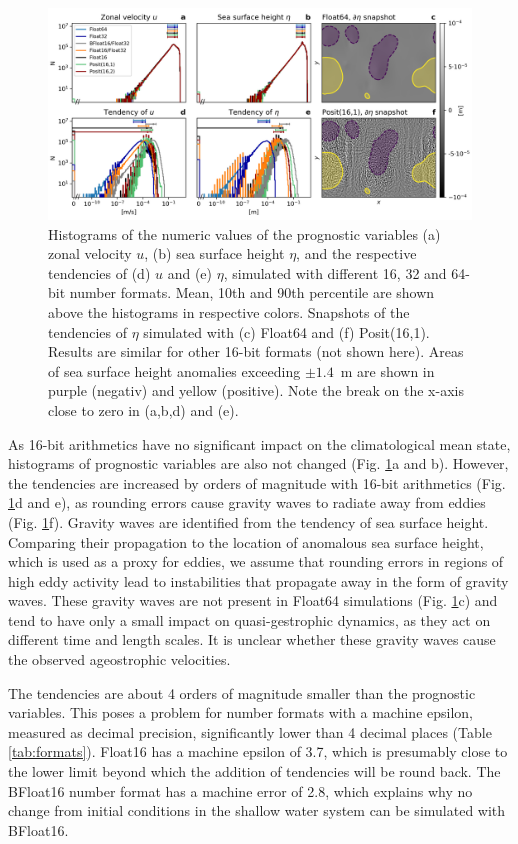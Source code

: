 \documentclass[draft]{agujournal2019}
\begin{document}
\begin{figure}
\includegraphics[width=1\textwidth]{../plots/tendency_hist.png}
\caption{Histograms of the numeric values of the prognostic variables (a) zonal velocity $u$, (b) sea surface height $\eta$, and the respective tendencies of (d) $u$ and (e) $\eta$, simulated with different 16, 32 and 64-bit number formats. Mean, 10th and 90th percentile are shown above the histograms in respective colors. Snapshots of the tendencies of $\eta$ simulated with (c) Float64 and (f) Posit(16,1). Results are similar for other 16-bit formats (not shown here). Areas of sea surface height anomalies exceeding $\pm1.4$~m are shown in purple (negativ) and yellow (positive). Note the break on the x-axis close to zero in (a,b,d) and (e).}
\label{fig:tend}
\end{figure}

As 16-bit arithmetics have no significant impact on the climatological mean state, histograms of prognostic variables are also not changed (Fig. \ref{fig:tend}a and b). However, the tendencies are increased by orders of magnitude with 16-bit arithmetics (Fig. \ref{fig:tend}d and e), as rounding errors cause gravity waves to radiate away from eddies (Fig. \ref{fig:tend}f). Gravity waves are identified from the tendency of sea surface height. Comparing their propagation to the location of anomalous sea surface height, which is used as a proxy for eddies, we assume that rounding errors in regions of high eddy activity lead to instabilities that propagate away in the form of gravity waves. These gravity waves are not present in Float64 simulations (Fig. \ref{fig:tend}c) and tend to have only a small impact on quasi-gestrophic dynamics, as they act on different time and length scales. It is unclear whether these gravity waves cause the observed ageostrophic velocities.

The tendencies are about 4 orders of magnitude smaller than the prognostic variables. This poses a problem for number formats with a machine epsilon, measured as decimal precision, significantly lower than 4 decimal places (Table \ref{tab:formats}). Float16 has a machine epsilon of 3.7, which is presumably close to the lower limit beyond which the addition of tendencies will be round back. The BFloat16 number format has a machine error of 2.8, which explains why no change from initial conditions in the shallow water system can be simulated with BFloat16.
\end{document}
